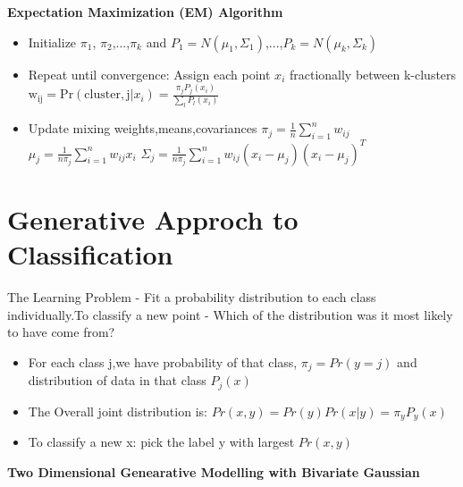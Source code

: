 \documentclass[12pt]{article}
\begin{document}
 
\textbf{Expectation Maximization (EM) Algorithm}

\begin{itemize}
	\item Initialize $\pi_{1}$, $\pi_{2}$,...,$\pi_{k}$ and $P_{1}=N(\mu_{1},\Sigma_{1})$,...,$P_{k}=N(\mu_{k},\Sigma_{k})$
	
\item	Repeat until convergence:
	Assign each point $x_{i}$ fractionally between k-clusters 
	$\mathrm{w_{ij}} = \mathrm{Pr}(\mathrm{cluster,j} \vert x_{i})=\frac {\pi_{j}P_{j}(x_{i})} {\sum_{l}P_{l}(x_{i})}$
	
\item	Update mixing weights,means,covariances
	$\pi_{j}=\frac{1}{n}\sum_{i=1}^{n}w_{ij}$
	$\mu_{j}=\frac{1}{n\pi_{j}}\sum_{i=1}^{n}w_{ij}x_{i}$
	$\Sigma_{j}=\frac{1}{n\pi_{j}} \sum_{i=1}^{n}w_{ij}(x_{i}-\mu_{j})(x_{i}-\mu_{j})^{T}$
\end{itemize}
 


\section{Generative Approch to Classification}

The Learning Problem - Fit a probability distribution to each class individually.To classify a new point - Which of the distribution was it most likely to have come from?


\begin{itemize}
\item	For each class j,we have probability of that class, $\pi_{j}=Pr(y=j)$ and distribution of data in that class $P_{j}(x)$ 
	
	\item The Overall joint distribution is: $Pr(x,y)=Pr(y)Pr(x\vert y)=\pi_{y}P_{y}(x)$
	
	\item To classify a new x: pick the label y with largest $Pr(x,y)$
	
\end{itemize}

 
\textbf{Two Dimensional Genearative Modelling with Bivariate Gaussian}
\end{document}
